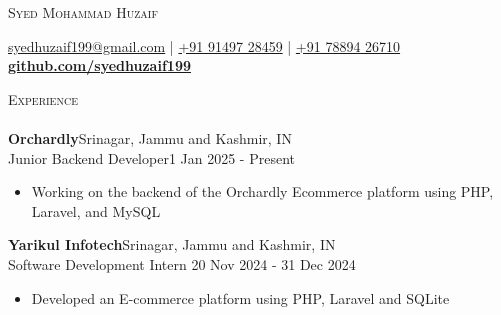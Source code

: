 \documentclass[a4paper]{article}
\newcommand{\lineunder} {
    \vspace*{-8pt} \\
    \hspace*{-18pt} \hrulefill \\
}
\newcommand{\header} [1] {
    {\hspace*{-18pt}\vspace*{6pt} \textsc{#1}}
    \vspace*{-6pt} \lineunder
}
\begin{document}
    \vspace*{-40pt}

    

%
%
  \vspace*{-2pt}
  \begin{center}
    {\Huge \scshape {Syed Mohammad Huzaif}}\\
    \vspace*{2pt}
    
    \vspace*{2pt}
    \href{mailto:syedhuzaif199@gmail.com}{syedhuzaif199@gmail.com} | \href{tel:+919149728459}{+91 91497 28459} | \href{tel:+917889426710}{+91 78894 26710}\\
    \vspace*{2pt}
    \textbf{\href{https://github.com/syedhuzaif199}{github.com/syedhuzaif199}}
  \end{center}

      \header{Experience}
    \vspace{2mm}
        \textbf{Orchardly}\hfill Srinagar, Jammu and Kashmir, IN\\
    Junior Backend Developer\hfill 1 Jan 2025 - Present\\
    \vspace{-2mm}
    \begin{itemize}
    \item[] Working on the backend of the Orchardly Ecommerce platform using PHP, Laravel, and MySQL
    \end{itemize}
      \vspace{2mm}
      \textbf{Yarikul Infotech}\hfill Srinagar, Jammu and Kashmir, IN\\
    Software Development Intern \hfill 20 Nov 2024 - 31 Dec 2024\\
    \vspace{-2mm}
    \begin{itemize}
    \item[] Developed an E-commerce platform using PHP, Laravel and SQLite
    \end{itemize}

    \vspace{2mm}
\end{document}
